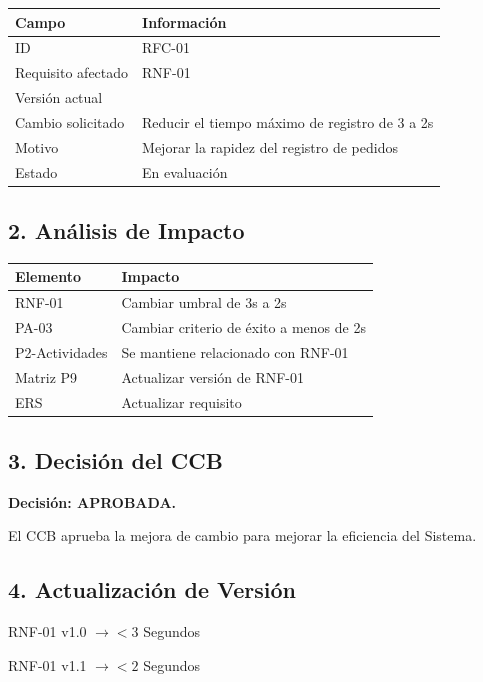 \documentclass[12pt,a4paper]{article}
\begin{document}
\begin{table}[H]
\centering
\small

\begin{tabularx}{0.92\textwidth}{
|>{\raggedright\arraybackslash}p{4cm}
|>{\raggedright\arraybackslash}X|
}
\hline

\textbf{Campo} &
\textbf{Información} \\
\hline

ID &
RFC-01 \\
\hline

Requisito afectado &
RNF-01 \\
\hline

Versión actual &
1.0 \\
\hline

Cambio solicitado &
Reducir el tiempo máximo de registro de 3 a 2s \\
\hline

Motivo &
Mejorar la rapidez del registro de pedidos \\
\hline

Estado &
En evaluación \\
\hline

\end{tabularx}
\end{table}

\subsection*{2. Análisis de Impacto}

\begin{table}[H]
\centering
\small

\begin{tabularx}{0.92\textwidth}{
|>{\raggedright\arraybackslash}p{4cm}
|>{\raggedright\arraybackslash}X|
}
\hline

\textbf{Elemento} &
\textbf{Impacto} \\
\hline

RNF-01 &
Cambiar umbral de 3s a 2s \\
\hline

PA-03 &
Cambiar criterio de éxito a menos de 2s \\
\hline

P2-Actividades &
Se mantiene relacionado con RNF-01 \\
\hline

Matriz P9 &
Actualizar versión de RNF-01 \\
\hline

ERS &
Actualizar requisito \\
\hline

\end{tabularx}
\end{table}

\subsection*{3. Decisión del CCB}

\textbf{Decisión: APROBADA.}

El CCB aprueba la mejora de cambio para mejorar la eficiencia del Sistema.

\subsection*{4. Actualización de Versión}

RNF-01 v1.0 $\rightarrow <3$ Segundos

\vspace{0.2cm}

RNF-01 v1.1 $\rightarrow <2$ Segundos
\end{document}

